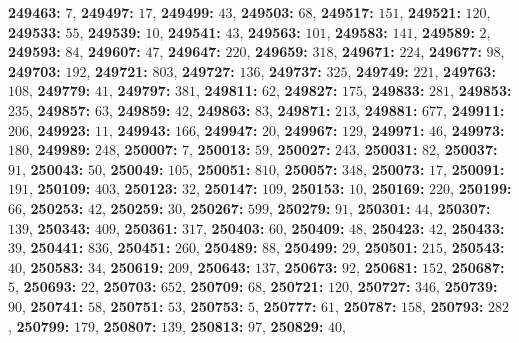 \textsf{\bfseries 249463:} $7$, \textsf{\bfseries 249497:} $17$, \textsf{\bfseries 249499:} $43$, \textsf{\bfseries 249503:} $68$, \textsf{\bfseries 249517:} $151$, \textsf{\bfseries 249521:} $120$, \textsf{\bfseries 249533:} $55$, \textsf{\bfseries 249539:} $10$, \textsf{\bfseries 249541:} $43$, \textsf{\bfseries 249563:} $101$, \textsf{\bfseries 249583:} $141$, \textsf{\bfseries 249589:} $2$, \textsf{\bfseries 249593:} $84$, \textsf{\bfseries 249607:} $47$, \textsf{\bfseries 249647:} $220$, \textsf{\bfseries 249659:} $318$, \textsf{\bfseries 249671:} $224$, \textsf{\bfseries 249677:} $98$, \textsf{\bfseries 249703:} $192$, \textsf{\bfseries 249721:} $803$, \textsf{\bfseries 249727:} $136$, \textsf{\bfseries 249737:} $325$, \textsf{\bfseries 249749:} $221$, \textsf{\bfseries 249763:} $108$, \textsf{\bfseries 249779:} $41$, \textsf{\bfseries 249797:} $381$, \textsf{\bfseries 249811:} $62$, \textsf{\bfseries 249827:} $175$, \textsf{\bfseries 249833:} $281$, \textsf{\bfseries 249853:} $235$, \textsf{\bfseries 249857:} $63$, \textsf{\bfseries 249859:} $42$, \textsf{\bfseries 249863:} $83$, \textsf{\bfseries 249871:} $213$, \textsf{\bfseries 249881:} $677$, \textsf{\bfseries 249911:} $206$, \textsf{\bfseries 249923:} $11$, \textsf{\bfseries 249943:} $166$, \textsf{\bfseries 249947:} $20$, \textsf{\bfseries 249967:} $129$, \textsf{\bfseries 249971:} $46$, \textsf{\bfseries 249973:} $180$, \textsf{\bfseries 249989:} $248$, \textsf{\bfseries 250007:} $7$, \textsf{\bfseries 250013:} $59$, \textsf{\bfseries 250027:} $243$, \textsf{\bfseries 250031:} $82$, \textsf{\bfseries 250037:} $91$, \textsf{\bfseries 250043:} $50$, \textsf{\bfseries 250049:} $105$, \textsf{\bfseries 250051:} $810$, \textsf{\bfseries 250057:} $348$, \textsf{\bfseries 250073:} $17$, \textsf{\bfseries 250091:} $191$, \textsf{\bfseries 250109:} $403$, \textsf{\bfseries 250123:} $32$, \textsf{\bfseries 250147:} $109$, \textsf{\bfseries 250153:} $10$, \textsf{\bfseries 250169:} $220$, \textsf{\bfseries 250199:} $66$, \textsf{\bfseries 250253:} $42$, \textsf{\bfseries 250259:} $30$, \textsf{\bfseries 250267:} $599$, \textsf{\bfseries 250279:} $91$, \textsf{\bfseries 250301:} $44$, \textsf{\bfseries 250307:} $139$, \textsf{\bfseries 250343:} $409$, \textsf{\bfseries 250361:} $317$, \textsf{\bfseries 250403:} $60$, \textsf{\bfseries 250409:} $48$, \textsf{\bfseries 250423:} $42$, \textsf{\bfseries 250433:} $39$, \textsf{\bfseries 250441:} $836$, \textsf{\bfseries 250451:} $260$, \textsf{\bfseries 250489:} $88$, \textsf{\bfseries 250499:} $29$, \textsf{\bfseries 250501:} $215$, \textsf{\bfseries 250543:} $40$, \textsf{\bfseries 250583:} $34$, \textsf{\bfseries 250619:} $209$, \textsf{\bfseries 250643:} $137$, \textsf{\bfseries 250673:} $92$, \textsf{\bfseries 250681:} $152$, \textsf{\bfseries 250687:} $5$, \textsf{\bfseries 250693:} $22$, \textsf{\bfseries 250703:} $652$, \textsf{\bfseries 250709:} $68$, \textsf{\bfseries 250721:} $120$, \textsf{\bfseries 250727:} $346$, \textsf{\bfseries 250739:} $90$, \textsf{\bfseries 250741:} $58$, \textsf{\bfseries 250751:} $53$, \textsf{\bfseries 250753:} $5$, \textsf{\bfseries 250777:} $61$, \textsf{\bfseries 250787:} $158$, \textsf{\bfseries 250793:} $282$, \textsf{\bfseries 250799:} $179$, \textsf{\bfseries 250807:} $139$, \textsf{\bfseries 250813:} $97$, \textsf{\bfseries 250829:} $40$, 
